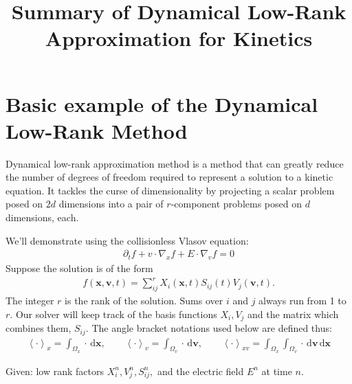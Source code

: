 \documentclass{article}
\title{Summary of Dynamical Low-Rank Approximation for Kinetics}
\begin{document}
\maketitle

\section*{Basic example of the Dynamical Low-Rank Method}

Dynamical low-rank approximation method is a method that can greatly reduce the number of degrees of freedom required to represent a solution to a kinetic equation.
It tackles the curse of dimensionality by projecting a scalar problem posed on \(2d\) dimensions into a pair of \(r\)-component problems posed on \(d\) dimensions, each.

We'll demonstrate using the collisionless Vlasov equation:
\begin{align}
    \label{eqn:vlasov}
    \partial_t f + v \cdot \nabla_x f + E \cdot \nabla_v f = 0
\end{align}
Suppose the solution is of the form
\begin{align}
    f(\bm{x}, \bm{v}, t) = \sum_{ij}^{r} X_i(\bm{x}, t) S_{ij}(t) V_j(\bm{v}, t).
\end{align}
The integer \(r\) is the rank of the solution. Sums over \(i\) and \(j\) always run from 1 to \(r\).
Our solver will keep track of the basis functions \(X_i, V_j\) and the matrix which combines them, \(S_{ij}\).
The angle bracket notations used below are defined thus:
\begin{align}
\left\langle \cdot \right\rangle_x = \int_{\Omega_x}^{} \cdot \,\mathrm{d}\bm{x}, \qquad \left\langle \cdot \right\rangle_v = \int_{\Omega_v}^{} \cdot \,\mathrm{d}\bm{v}, \qquad \left\langle \cdot \right\rangle_{xv} = \int_{\Omega_x}^{} \int_{\Omega_v}^{} \cdot \,\mathrm{d}\bm{v} \,\mathrm{d}\bm{x}
\end{align}

Given: low rank factors \(X_i^n, V_j^n, S_{ij}^n,\) and the electric field \(E^n\) at time \(n\).
\end{document}
